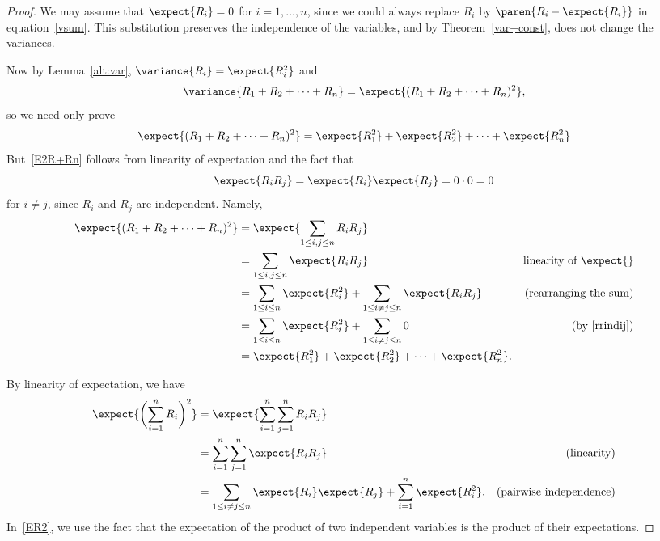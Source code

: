 \begin{editingnotes}

\begin{proof}
  We may assume that $\expect{R_i} = 0$ for $i=1,\dots,n$, since we could
  always replace $R_i$ by $\paren{R_i-\expect{R_i}}$ in
  equation~\eqref{vsum}.  This substitution preserves the independence of
  the variables, and by Theorem~\ref{var+const}, does not change the
  variances.

  Now by Lemma~\ref{alt:var}, $\variance{R_i} = \expect{R_i^2}$ and
\[
\variance{R_1+R_2+\cdots+R_n} = \expect{(R_1+R_2+\cdots+R_n)^2},
\]
so we need only prove
\begin{equation}\label{E2R+Rn}
\expect{(R_1+R_2+\cdots+R_n)^2} = \expect{R_1^2} + \expect{R_2^2} + \cdots
+ \expect{R_n^2}
\end{equation}
But~\eqref{E2R+Rn} follows from linearity of expectation and the fact that
\begin{equation}\label{rrindij}
\expect{R_iR_j} = \expect{R_i}\expect{R_j} = 0 \cdot 0 = 0
\end{equation}
for $i \neq j$, since $R_i$ and $R_j$ are independent.  Namely,
\begin{align*}
\expect{(R_1+R_2+\cdots+R_n)^2}
   & = \expect{\sum_{1\leq i,j \leq n} R_iR_j}\\
   & = \sum_{1\leq i,j \leq n} \expect{R_iR_j} & \text{linearity of $\expect{}$}\\
   & = \sum_{1 \leq i \leq n} \expect{R_i^2}
             + \sum_{1 \leq i \neq j \leq n} \expect{R_iR_j} &
             \text{(rearranging the sum)}\\
   & = \sum_{1 \leq i \leq n} \expect{R_i^2}
            + \sum_{1 \leq i \neq j \leq n} 0
             & \text{(by~\eqref{rrindij})}\\
   & =  \expect{R_1^2} + \expect{R_2^2} + \cdots + \expect{R_n^2}.
\end{align*}


\iffalse
By linearity of expectation, we have
\begin{align}
\expect{\biggl(\sum_{i=1}^n R_i\biggr)^2} &
    = \expect{\sum_{i=1}^n \sum_{j=1}^n R_i R_j} \notag\\
   &  = \sum_{i=1}^n \sum_{j=1}^n \expect{R_i R_j} & \text{(linearity)}\notag\\
   & = \sum_{1\le i \neq j \le n} \expect{R_i}\expect{R_j} + \sum_{i=1}^n
     \expect{R_i^2}.
       & \text{(pairwise independence)} \label{ER2}
\end{align}
In~\eqref{ER2}, we use the fact that the expectation
of the product of two independent variables is the product of their
expectations.


\end{proof}
\end{editingnotes}
